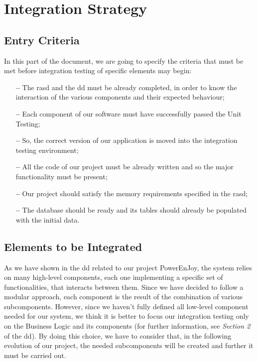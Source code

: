 \section{Integration Strategy} \label{sec:intstra}

\subsection{Entry Criteria}

In this part of the document, we are going to specify the criteria that must be met before integration testing of specific elements may begin:

\begin{itemize}

\item[\textbf{--}] The \acl{rasd} and the \acl{dd} must be already completed, in order to know the interaction of the various components and their expected behaviour;

\item[\textbf{--}] Each component of our software must have successfully passed the Unit Testing;

\item[\textbf{--}] So, the correct version of our application is moved into the integration testing environment;

\item[\textbf{--}] All the code of our project must be already written and so the major functionality must be present;

\item[\textbf{--}] Our project should satisfy the memory requirements specified in the \acs{rasd};

\item[\textbf{--}] The database should be ready and its tables should already be populated with the initial data.

\end{itemize}

\subsection{Elements to be Integrated}

As we have shown in the \acl{dd} related to our project PowerEnJoy, the system relies on many high-level components, each one implementing a specific set of functionalities, that interacts between them.
Since we have decided to follow a modular approach, each component is the result of the combination of various subcomponents.
However, since we haven't fully defined all low-level component needed for our system, we think it is better to focus our integration testing only on the Business Logic and its components (for further information, see \textit{Section 2} of the \acl{dd}). By doing this choice, we have to consider that, in the following evolution of our project, the needed subcomponents will be created and further \acl{it} must be carried out.
 
